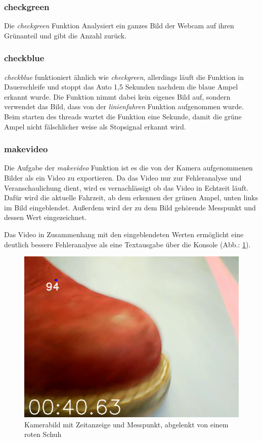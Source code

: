 \documentclass[a4paper, 12pt]{scrartcl}
\begin{document}
\newpage
\subsubsection{checkgreen}	%


Die \textit{checkgreen} Funktion Analysiert ein ganzes Bild der Webcam auf ihren Grünanteil und gibt die Anzahl zurück.

\newpage
\subsubsection{checkblue}	%


\textit{checkblue} funktioniert ähnlich wie \textit{checkgreen}, allerdings läuft die Funktion in Dauerschleife und stoppt das Auto 1,5 Sekunden nachdem die blaue Ampel erkannt wurde.
Die Funktion nimmt dabei kein eigenes Bild auf, sondern verwendet das Bild, dass von der \textit{linienfahren} Funktion aufgenommen wurde. Beim starten des threads wartet die Funktion eine Sekunde, damit die grüne Ampel nicht fälschlicher weise als Stopsignal erkannt wird.

\newpage
\subsubsection{makevideo}	%


Die Aufgabe der \textit{makevideo} Funktion ist es die von der Kamera aufgenommenen Bilder als ein Video zu exportieren. Da das Video nur zur Fehleranalyse und Veranschaulichung dient, wird es vernachlässigt ob das Video in Echtzeit läuft. Dafür wird die aktuelle Fahrzeit, ab dem erkennen der grünen Ampel, unten links im Bild eingeblendet. Außerdem wird der zu dem Bild gehörende Messpunkt und dessen Wert eingezeichnet.

Das Video in Zusammenhang mit den eingeblendeten Werten ermöglicht eine deutlich bessere Fehleranalyse als eine Textausgabe über die Konsole (Abb.: \ref{schuh_im_bild}).

\begin{figure}[ht!] \centering
	\includegraphics[width=.5\textwidth]{schuh_im_bild.png}
	\caption{Kamerabild mit Zeitanzeige und Messpunkt, abgelenkt von einem roten Schuh}
	\label{schuh_im_bild}
\end{figure}
\end{document}
